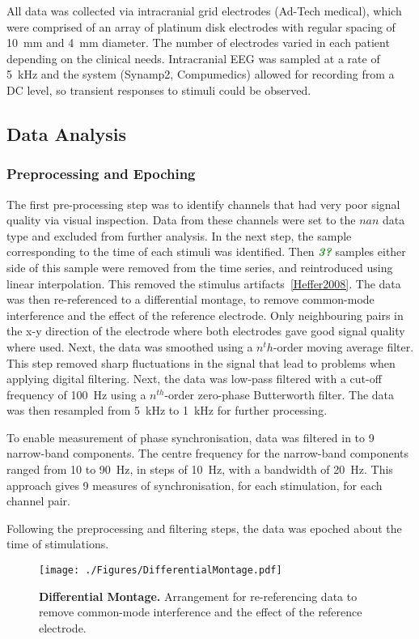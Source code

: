 \documentclass[]{article}
\newcommand{\dean}[1]{\textsf{\emph{\textbf{\textcolor{green}{#1}}}}}
\begin{document}
All data was collected via intracranial grid electrodes (Ad-Tech medical), which were comprised of an array of platinum disk electrodes with regular spacing of 10~mm and 4~mm diameter. The number of electrodes varied in each patient depending on the clinical needs. Intracranial EEG was sampled at a rate of 5~kHz and the system (Synamp2, Compumedics) allowed for recording from a DC level, so transient responses to stimuli could be observed.

\subsection{Data Analysis}
\subsubsection{Preprocessing and Epoching}
The first pre-processing step was to identify channels that had very poor signal quality via visual inspection. Data from these channels were set to the $nan$ data type and excluded from further analysis. In the next step, the sample corresponding to the time of each stimuli was identified. Then \dean{3?} samples either side of this sample were removed from the time series, and reintroduced using linear interpolation. This removed the stimulus artifacts~\ref{Heffer2008}. The data was then re-referenced to a differential montage, to remove common-mode interference and the effect of the reference electrode. Only neighbouring pairs in the x-y direction of the electrode where both electrodes gave good signal quality where used. Next, the data was smoothed using a $n^th$-order moving average filter. This step removed sharp fluctuations in the signal that lead to problems when applying digital filtering. Next, the data was low-pass filtered with a cut-off frequency of 100~Hz using a $n^{th}$-order zero-phase Butterworth filter. The data was then resampled from 5~kHz to 1~kHz for further processing.

To enable measurement of phase synchronisation, data was filtered in to 9 narrow-band components. The centre frequency for the narrow-band components ranged from 10 to 90~Hz, in steps of 10~Hz, with a bandwidth of 20~Hz. This approach gives 9 measures of synchronisation, for each stimulation, for each channel pair.

Following the preprocessing and filtering steps, the data was epoched about the time of stimulations. 
\begin{figure}[htbp]
	\centering
		\texttt{[image: ./Figures/DifferentialMontage.pdf]}
	\caption{\textbf{Differential Montage.} Arrangement for re-referencing data to remove common-mode interference and the effect of the reference electrode.}
	\label{fig:DifMontage}
\end{figure}
\end{document}
